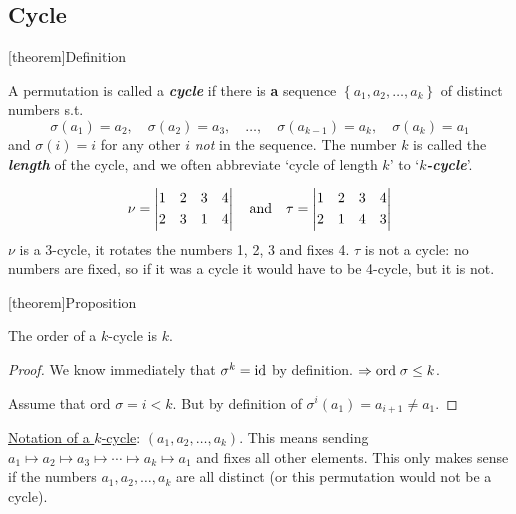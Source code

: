 \documentclass[12pt]{report}
\theoremstyle{definition}
\begin{document}
\subsection{Cycle}

[theorem]{Definition}
\begin{cycles}
    A permutation is called a \textbf{\emph{cycle}} if there is \textbf{a} sequence
    $\left\{a_1, a_2, \ldots, a_k\right\} $ of distinct numbers s.t.\[
        \sigma (a_1) = a_2,\quad \sigma(a_2) = a_3,\quad \ldots,\quad \sigma (a_{k-1}) = a_k,\quad \sigma (a_k) = a_1
    \]and $\sigma (i) = i$ for any other $i$ \emph{not} in the sequence.
    The number $k$ is called the \textbf{\emph{length}} of the cycle, and we often abbreviate 
    `cycle of length $k$' to `\textbf{\emph{$k$-cycle}}'.
\end{cycles}

\begin{ex}
    \[
        \nu = \left|
        \begin{align*}
            & 1 && 2 && 3 && 4 \\
            & 2 && 3 && 1 && 4
        \end{align*}
        \right|
        \quad \textnormal{and} \quad
        \tau= \left|
        \begin{align*}
            & 1 && 2 && 3 && 4 \\
            & 2 && 1 && 4 && 3
        \end{align*}
        \right| 
    \]
    $\nu$ is a 3-cycle, it rotates the numbers 1, 2, 3 and fixes 4.
    $\tau$ is not a cycle: no numbers are fixed, so if it was a cycle
    it would have to be 4-cycle, but it is not.
\end{ex}

[theorem]{Proposition}
\begin{order of k-cycle}
    The order of a $k$-cycle is $k$.
\end{order of k-cycle}

\begin{proof}
    We know immediately that $\sigma^{k} = \textnormal{id}$ by definition.
    $\Rightarrow \textnormal{ord}\; \sigma \le k$.
    
    Assume that ord $\sigma = i < k$. But by definition of $\sigma^{i}(a_1) = a_{i + 1} \neq a_1$.
\end{proof}

\underline{Notation of a $k$-cycle}: $(a_1, a_2, \ldots, a_k)$.
This means sending $a_1 \mapsto a_2 \mapsto a_3 \mapsto \cdots \mapsto a_k \mapsto a_1$
and fixes all other elements. This only makes sense if the numbers 
$a_1, a_2, \ldots, a_k$ are all distinct (or this permutation would not be a cycle).
\end{document}
